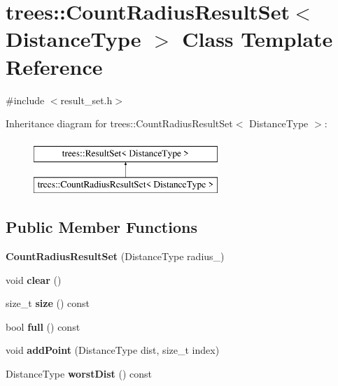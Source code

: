 \hypertarget{classtrees_1_1_count_radius_result_set}{}\section{trees\+:\+:Count\+Radius\+Result\+Set$<$ Distance\+Type $>$ Class Template Reference}
\label{classtrees_1_1_count_radius_result_set}


{\ttfamily \#include $<$result\+\_\+set.\+h$>$}

Inheritance diagram for trees\+:\+:Count\+Radius\+Result\+Set$<$ Distance\+Type $>$\+:\begin{figure}[H]
\begin{center}
\leavevmode
\includegraphics[height=2.000000cm]{classtrees_1_1_count_radius_result_set}
\end{center}
\end{figure}
\subsection*{Public Member Functions}
\begin{DoxyCompactItemize}
\item 
\mbox{\label{classtrees_1_1_count_radius_result_set_ac43b2810f33cfea632f514bbce78b20f}} 
{\bfseries Count\+Radius\+Result\+Set} (Distance\+Type radius\+\_\+)
\item 
\mbox{\label{classtrees_1_1_count_radius_result_set_a7f5c3d6831610ee002bc2372fbf28eef}} 
void {\bfseries clear} ()
\item 
\mbox{\label{classtrees_1_1_count_radius_result_set_a292fb4fa1d8690f33fcf988d59c85922}} 
size\+\_\+t {\bfseries size} () const
\item 
\mbox{\label{classtrees_1_1_count_radius_result_set_ad9f498bee21c16052b36fd852c338143}} 
bool {\bfseries full} () const
\item 
\mbox{\label{classtrees_1_1_count_radius_result_set_ad91ad04231f5256444c2b0684e519252}} 
void {\bfseries add\+Point} (Distance\+Type dist, size\+\_\+t index)
\item 
\mbox{\label{classtrees_1_1_count_radius_result_set_afe11310933b2e5b27b5b5b2fc4cf25ac}} 
Distance\+Type {\bfseries worst\+Dist} () const
\end{DoxyCompactItemize}
